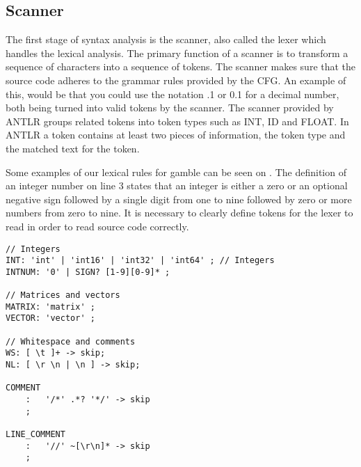 \subsection*{Scanner}
The first stage of syntax analysis is the scanner, also called the lexer which handles the lexical analysis.
The primary function of a scanner is to transform a sequence of characters into a sequence of tokens.
The scanner makes sure that the source code adheres to the grammar rules provided by the CFG.
An example of this, would be that you could use the notation .1 or 0.1 for a decimal number, both being turned into valid tokens by the scanner.
The scanner provided by ANTLR groups related tokens into token types such as INT, ID and FLOAT.
In ANTLR a token contains at least two pieces of information, the token type and the matched text for the token.

Some examples of our lexical rules for \gls{gamble} can be seen on .
The definition of an integer number on line 3 states that an integer is either a zero or an optional negative sign followed by a single digit from one to nine followed by zero or more numbers from zero to nine.
It is necessary to clearly define tokens for the lexer to read in order to read source code correctly. \citep{Crafting_book}

\begin{lstlisting}[caption=Example of our lexer rules for ANTLR4,frame=tlrb,label={lst:token}]
// Integers
INT: 'int' | 'int16' | 'int32' | 'int64' ; // Integers
INTNUM: '0' | SIGN? [1-9][0-9]* ;

// Matrices and vectors
MATRIX: 'matrix' ;
VECTOR: 'vector' ; 

// Whitespace and comments
WS: [ \t ]+ -> skip;
NL: [ \r \n | \n ] -> skip;

COMMENT
    :   '/*' .*? '*/' -> skip
    ;

LINE_COMMENT
    :   '//' ~[\r\n]* -> skip
    ;
\end{lstlisting}